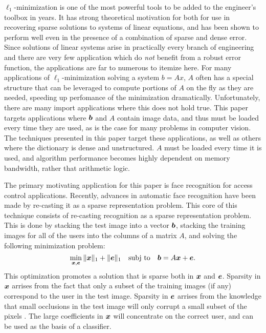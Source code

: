 \documentclass[10pt,twocolumn,letterpaper]{article}
\begin{document}
$\ell_1$-minimization is one of the most powerful tools to be added to the engineer's
toolbox in years.  It has strong theoretical motivation for both for use in recovering sparse
solutions to systems of linear equations, and has been shown to perform well even in the
presence of a combination of sparse and dense error.  Since solutions of linear systems
arise in practically every branch of engineering and there are very few application which
do {\em not} benefit from a robust error function, the applications are far to numerous to
itemize here.  
For many applications of $\ell_1$-minimization solving a system $b=Ax$, $A$ often has a
special structure that can be leveraged to compute portions of $A$ on the fly
as they are needed, speeding up perfomance of the minimization dramatically.
Unfortunately, there are many import applications where this does not hold true.
This paper targets applications where $\boldsymbol{b}$ and $A$ contain
image data, and thus must be loaded every time they are used, as is the 
case for many problems in computer vision.
The techniques presented in this paper target these applications, as well
as others where the dictionary is dense and unstructured. $A$ must be loaded every time
it is used, and algorithm performance becomes highly dependent on memory bandwidth, rather
that arithmetic logic.

The primary motivating application for this paper is face recognition for access control applications.
Recently, advances in automatic face recognition have been made by re-casting
it as a sparse representation problem.  This core of this technique consists of
re-casting recognition as a sparse representation problem. This is done by  
stacking the test image into a vector $\boldsymbol{b}$, stacking the training images for
all of the users into the columns of a matrix $A$, and solving the following
minimization problem:
\begin{equation}
\min_{{\boldsymbol{x}}, \boldsymbol{e}} \| {\boldsymbol{x}} \|_1 + \|\boldsymbol{e}\|_1 \quad \textup{subj to} \quad \boldsymbol{b} = A {\boldsymbol{x}} + \boldsymbol{e}.
\end{equation}
This optimization promotes a solution that is sparse both in ${\boldsymbol{x}}$ and $\boldsymbol{e}$. 
Sparsity in ${\boldsymbol{x}}$ arrises from the fact that only a subset of the training images (if any)
correspond to the user in the test image.  Sparsity in $\boldsymbol{e}$ arrises from the knowledge
that small occlusions in the test image will only corrupt a small subset of the pixels \cite{Wright2009-PAMI}.
The large coefficients in ${\boldsymbol{x}}$ will concentrate on the correct user, and can be used as the basis of a classifier.
\end{document}

